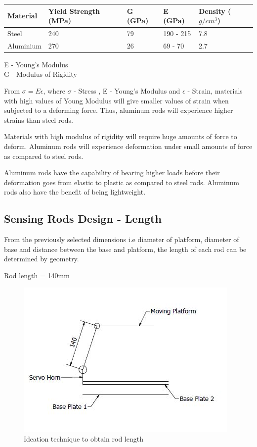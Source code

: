 \begin{tabular}{|l|l|l|l|l|}
\hline
\textbf{Material} & \textbf{Yield Strength (MPa)} & \textbf{G (GPa)} & \textbf{E (GPa)} & \textbf{Density ($g/cm^3$)}\\
\hline
Steel & 240 & 79 & 190 - 215 & 7.8\\
\hline
Aluminium & 270 & 26 & 69 - 70 & 2.7\\
\hline
\end{tabular}

E - Young's Modulus\\
G - Modulus of Rigidity

From $ \sigma = E \epsilon $, where $\sigma$ - Stress , E - Young's Modulus and $ \epsilon$ - Strain, materials with high values of Young Modulus will give smaller values of strain when subjected to a deforming force. Thus, aluminum rods will experience higher strains than steel rods.

Materials with high modulus of rigidity will require huge amounts of force to deform. Aluminum rods will experience deformation under small amounts of force as compared to steel rods.

Aluminum rods have the capability of bearing higher loads before their deformation goes from elastic to plastic as compared to steel rods. Aluminum rods also have the benefit of being lightweight.

\subsection{Sensing Rods Design - Length}
From the previously selected dimensions i.e diameter of platform, diameter of base and distance between the base and platform, the length of each rod can be determined by geometry.

Rod length = 140mm
\begin{center}
	\begin{figure}[!h]
	\centering
	\includegraphics[width=0.6\linewidth]{Figures/Ideation}
	\caption[Ideation]{Ideation technique to obtain rod length}
	\end{figure}
\end{center}

